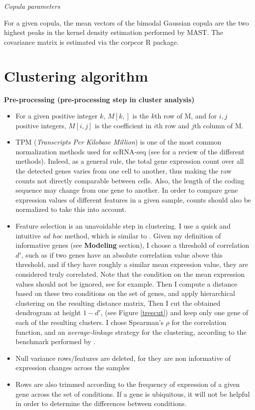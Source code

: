 \documentclass{report}
\begin{document}
{\bigskip
\noindent \textit{Copula parameters}
\bigskip

For a given copula, the mean vectors of the bimodal Gaussian copula are the two highest peaks in the kernel density estimation performed by MAST. The covariance matrix is estimated via the corpcor R package\cite{schafer2005shrinkage}.

\section*{Clustering algorithm}

\bigskip
\noindent \textbf{Pre-processing (pre-processing step in cluster analysis)}
\bigskip

\begin{itemize}
\item For a given positive integer $k$, $M[k,]$ is the $k$th row of M, and for $i,j$ positive integers, $M[i,j]$ is the coefficient in $i$th row and $j$th column of M.
\item TPM (\textit{Transcripts Per Kilobase Million}) is one of the most common normalization methods used for scRNA-seq (see \cite{normMethods} for a review of the different methods). Indeed, as a general rule, the total gene expression count over all the detected genes varies from one cell to another, thus making the raw counts not directly comparable between cells. Also, the length of the coding sequence may change from one gene to another. In order to compare gene expression values of different features in a given sample, counts should also be normalized to take this into account\cite{love2014moderated}. 
\item Feature selection is an unavoidable step in clustering\cite{liu2006efficient}. I use a quick and intuitive \textit{ad hoc} method, which is similar to \cite{kuhn2008caret}. Given my definition of informative genes (see \textbf{Modeling} section), I choose a threshold of correlation $d'$, such as if two genes have an absolute correlation value above this threshold, and if they have roughly a similar mean expression value, they are considered truly correlated. Note that the condition on the mean expression values should not be ignored, see \cite{guyon2003introduction} for example. Then I compute a distance based on these two conditions on the set of genes, and apply hierarchical clustering on the resulting distance matrix, Then I cut the obtained dendrogram at height $1-d'$, (see Figure \ref{treecut}) and keep only one gene of each of the resulting clusters. I chose Spearman's $\rho$ for the correlation function, and an \textit{average-linkage} strategy for the clustering, according to the benchmark performed by \cite{jaskowiak2014selection}.
\item Null variance rows/features are deleted, for they are non informative of expression changes across the samples
\item Rows are also trimmed according to the frequency of expression of a given gene across the set of conditions. If a gene is ubiquitous, it will not be helpful in order to determine the differences between conditions\cite{guo2015sincera}\cite{kiselev2016sc3}.
\end{itemize}

}
\end{document}
